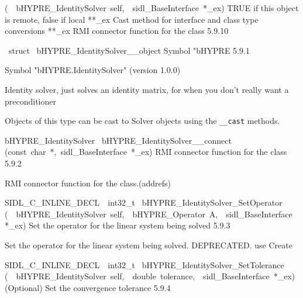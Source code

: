 \documentclass{article}
\begin{document}
\begin{cxxentry}
\begin{cxxentry}
\begin{cxxnames}
        {(\ \ bHYPRE\_IdentitySolver\ self,\ \ sidl\_BaseInterface\ *\_ex)}
        {
TRUE if this object is remote, false if local}
        {}
\label{cxx.5.9.35}
        {**\_ex}
        {}
        {
Cast method for interface and class type conversions}
        {}
\label{cxx.5.9.36}
        {**\_ex}
        {}
        {
RMI connector function for the class}
        {5.9.10}
\end{cxxnames}
\begin{cxxvariable}
{\ struct\ }
        {bHYPRE\_IdentitySolver\_\_object}
        {}
        {
Symbol "bHYPRE}
        {5.9.1}
\begin{cxxdoc}

Symbol "bHYPRE.IdentitySolver" (version 1.0.0)

Identity solver, just solves an identity matrix, for when you don't really
want a preconditioner

Objects of this type can be cast to Solver objects using the
{\tt \_\_cast} methods.
\end{cxxdoc}
\end{cxxvariable}
\begin{cxxfunction}
{bHYPRE\_IdentitySolver\ }
        {bHYPRE\_IdentitySolver\_\_connect}
        {(const\ char\ *,\ sidl\_BaseInterface\ *\_ex)}
        {
RMI connector function for the class}
        {5.9.2}
\begin{cxxdoc}

RMI connector function for the class.(addrefs)
\end{cxxdoc}
\end{cxxfunction}
\begin{cxxfunction}
{SIDL\_C\_INLINE\_DECL\ \ int32\_t\ }
        {bHYPRE\_IdentitySolver\_SetOperator}
        {(\ \ bHYPRE\_IdentitySolver\ self,\ \ bHYPRE\_Operator\ A,\ \ sidl\_BaseInterface\ *\_ex)}
        {
Set the operator for the linear system being solved}
        {5.9.3}
\begin{cxxdoc}

Set the operator for the linear system being solved.
DEPRECATED.  use Create
\end{cxxdoc}
\end{cxxfunction}
\begin{cxxfunction}
{SIDL\_C\_INLINE\_DECL\ \ int32\_t\ }
        {bHYPRE\_IdentitySolver\_SetTolerance}
        {(\ \ bHYPRE\_IdentitySolver\ self,\ \ double\ tolerance,\ \ sidl\_BaseInterface\ *\_ex)}
        {
(Optional) Set the convergence tolerance}
        {5.9.4}
\begin{cxxdoc}


\end{cxxdoc}
\end{cxxfunction}
\end{cxxentry}
\end{cxxentry}
\end{document}
